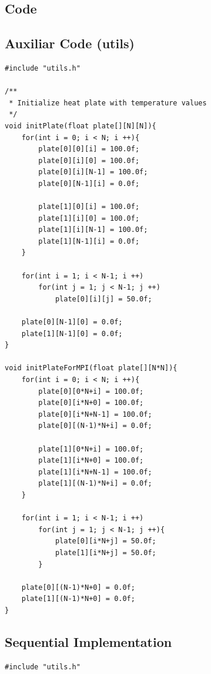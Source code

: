 \documentclass{article}
\begin{document}
\newpage 
\begin{appendices}

\section{Code}

\subsection{Auxiliar Code (utils)}
\begin{framed}
\begin{verbatim}
#include "utils.h"

/**
 * Initialize heat plate with temperature values
 */
void initPlate(float plate[][N][N]){
    for(int i = 0; i < N; i ++){
        plate[0][0][i] = 100.0f;
        plate[0][i][0] = 100.0f;
        plate[0][i][N-1] = 100.0f;
        plate[0][N-1][i] = 0.0f;

        plate[1][0][i] = 100.0f;
        plate[1][i][0] = 100.0f;
        plate[1][i][N-1] = 100.0f;
        plate[1][N-1][i] = 0.0f;
    }

    for(int i = 1; i < N-1; i ++)
        for(int j = 1; j < N-1; j ++)
            plate[0][i][j] = 50.0f;

    plate[0][N-1][0] = 0.0f;
    plate[1][N-1][0] = 0.0f;
}

void initPlateForMPI(float plate[][N*N]){
    for(int i = 0; i < N; i ++){
        plate[0][0*N+i] = 100.0f;
        plate[0][i*N+0] = 100.0f;
        plate[0][i*N+N-1] = 100.0f;
        plate[0][(N-1)*N+i] = 0.0f;

        plate[1][0*N+i] = 100.0f;
        plate[1][i*N+0] = 100.0f;
        plate[1][i*N+N-1] = 100.0f;
        plate[1][(N-1)*N+i] = 0.0f;
    }

    for(int i = 1; i < N-1; i ++)
        for(int j = 1; j < N-1; j ++){
            plate[0][i*N+j] = 50.0f;
            plate[1][i*N+j] = 50.0f;
        }

    plate[0][(N-1)*N+0] = 0.0f;
    plate[1][(N-1)*N+0] = 0.0f;
}
\end{verbatim}
\end{framed}

\subsection{Sequential Implementation}\label{seqImp}
\begin{framed}
\begin{verbatim}
#include "utils.h"


\end{verbatim}
\end{framed}
\end{appendices}
\end{document}
